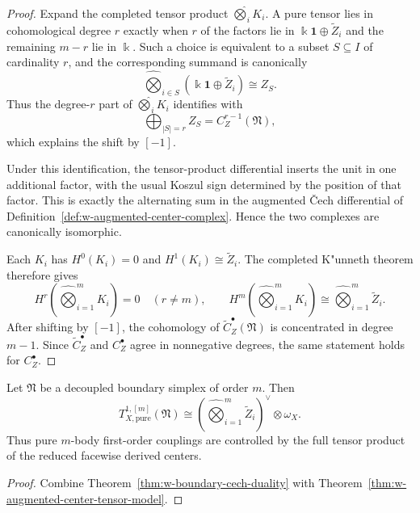 \begin{proof}
Expand the completed tensor product $\widehat\bigotimes_i K_i$. A pure tensor lies in cohomological
degree $r$ exactly when $r$ of the factors lie in $\Bbbk\mathbf{1}\oplus \widetilde Z_i$ and the remaining
$m-r$ lie in $\Bbbk$. Such a choice is equivalent to a subset $S\subseteq I$ of cardinality $r$, and the
corresponding summand is canonically
\[
\widehat\bigotimes_{i\in S}(\Bbbk\mathbf{1}\oplus \widetilde Z_i)
\cong Z_S.
\]
Thus the degree-$r$ part of $\widehat\bigotimes_i K_i$ identifies with
\[
\bigoplus_{|S|=r} Z_S = C_Z^{r-1}(\mathfrak N),
\]
which explains the shift by $[-1]$.

Under this identification, the tensor-product differential inserts the unit in one additional factor, with
the usual Koszul sign determined by the position of that factor. This is exactly the alternating sum in the
augmented \v{C}ech differential of Definition~\ref{def:w-augmented-center-complex}. Hence the two complexes
are canonically isomorphic.

Each $K_i$ has $H^0(K_i)=0$ and $H^1(K_i)\cong \widetilde Z_i$. The completed K"unneth theorem therefore gives
\[
H^r\left(\widehat\bigotimes_{i=1}^m K_i\right)=0\quad (r\neq m),
\qquad
H^m\left(\widehat\bigotimes_{i=1}^m K_i\right)
\cong
\widehat\bigotimes_{i=1}^m \widetilde Z_i.
\]
After shifting by $[-1]$, the cohomology of $\widetilde C_Z^\bullet(\mathfrak N)$ is concentrated in degree $m-1$.
Since $\widetilde C_Z^\bullet$ and $C_Z^\bullet$ agree in nonnegative degrees, the same statement holds for
$C_Z^\bullet$.
\end{proof}

\begin{corollary}
Let $\mathfrak N$ be a decoupled boundary simplex of order $m$. Then
\[
T^{1,[m]}_{X,\mathrm{pure}}(\mathfrak N)
\cong
\left(\widehat\bigotimes_{i=1}^m \widetilde Z_i\right)^\vee\otimes \omega_X.
\]
Thus pure $m$-body first-order couplings are controlled by the full tensor product of the reduced
facewise derived centers.
\end{corollary}

\begin{proof}
Combine Theorem~\ref{thm:w-boundary-cech-duality} with
Theorem~\ref{thm:w-augmented-center-tensor-model}.
\end{proof}

